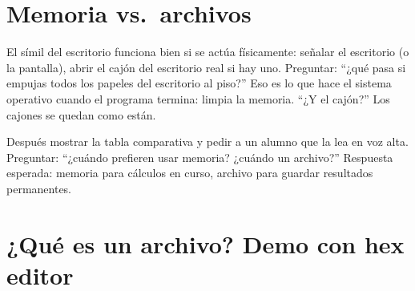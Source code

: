 \documentclass[12pt, oneside]{article}
\begin{document}
\section{Memoria vs.\ archivos}

\begin{notaprofesor}
  El símil del escritorio funciona bien si se actúa físicamente: señalar
  el escritorio (o la pantalla), abrir el cajón del escritorio real si hay
  uno.  Preguntar: ``¿qué pasa si empujas todos los papeles del escritorio
  al piso?''  Eso es lo que hace el sistema operativo cuando el programa
  termina: limpia la memoria.  ``¿Y el cajón?''  Los cajones se quedan como
  están.
  \par\smallskip
  Después mostrar la tabla comparativa y pedir a un alumno que la lea en
  voz alta.  Preguntar: ``¿cuándo prefieren usar memoria?  ¿cuándo un
  archivo?''  Respuesta esperada: memoria para cálculos en curso, archivo
  para guardar resultados permanentes.
\end{notaprofesor}

\section{¿Qué es un archivo?  Demo con hex editor}
\end{document}
